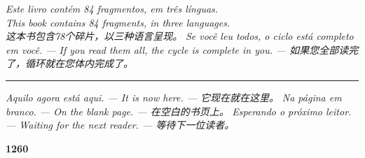 \documentclass[14pt,openany]{extbook}
\begin{document}
\newpage
\thispagestyle{empty}
\null
\vfill
\begin{center}

\vspace*{\fill}

\textit{Este livro contém 84 fragmentos, em três línguas.\\[0.2em]
This book contains 84 fragments, in three languages.\\[0.2em]
这本书包含78个碎片，以三种语言呈现。}
\textit{Se você leu todos, o ciclo está completo em você. --- If you read them all, the cycle is complete in you. --- 如果您全部读完了，循环就在您体内完成了。}

\vspace{2em}
\rule{0.2\textwidth}{0.5pt}

\vspace{2em}
\textit{Aquilo agora está aqui. --- It is now here. --- 它现在就在这里。}
\textit{Na página em branco. --- On the blank page. --- 在空白的书页上。}
\textit{Esperando o próximo leitor. --- Waiting for the next reader. --- 等待下一位读者。}

\vspace{2em}
\textcolor{olho}{\large \textbf{1260}}
\end{center}

\vfill
\clearpage
\end{document}
